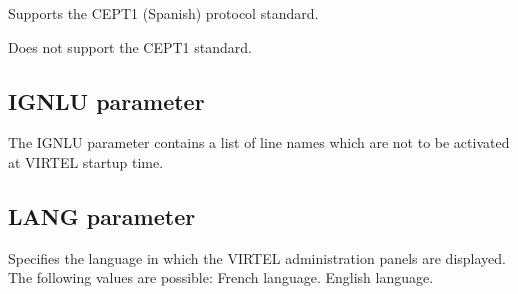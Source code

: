 \documentclass[letterpaper,10pt,english]{sphinxmanual}
\begin{document}
\sphinxAtStartPar
{} \sphinxhyphen{} Supports the CEPT1 (Spanish) protocol standard.

\sphinxAtStartPar
{} \sphinxhyphen{} Does not support the CEPT1 standard.

\ignorespaces 

\subsection{IGNLU parameter}
\label{\detokenize{Installation_Guide:ignlu-parameter}}\label{\detokenize{Installation_Guide:index-83}}
\begin{sphinxVerbatim}[commandchars=\\\{\}]
            
\end{sphinxVerbatim}

\sphinxAtStartPar
{} \sphinxhyphen{} The IGNLU parameter contains a list of line names which are not to be activated at VIRTEL startup time.

\ignorespaces 

\subsection{LANG parameter}
\label{\detokenize{Installation_Guide:lang-parameter}}\label{\detokenize{Installation_Guide:index-84}}
\begin{sphinxVerbatim}[commandchars=\\\{\}]
                             
\end{sphinxVerbatim}

\sphinxAtStartPar
Specifies the language in which the VIRTEL administration panels are displayed. The following values are possible:
 \sphinxhyphen{} French language.
 \sphinxhyphen{} English language.
\end{document}

